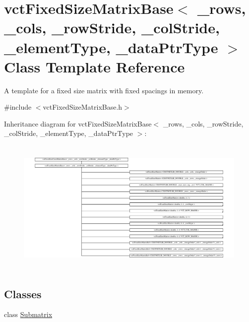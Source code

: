 \hypertarget{classvct_fixed_size_matrix_base}{\section{vct\-Fixed\-Size\-Matrix\-Base$<$ \-\_\-rows, \-\_\-cols, \-\_\-row\-Stride, \-\_\-col\-Stride, \-\_\-element\-Type, \-\_\-data\-Ptr\-Type $>$ Class Template Reference}
\label{classvct_fixed_size_matrix_base}
}


A template for a fixed size matrix with fixed spacings in memory.  




{\ttfamily \#include $<$vct\-Fixed\-Size\-Matrix\-Base.\-h$>$}

Inheritance diagram for vct\-Fixed\-Size\-Matrix\-Base$<$ \-\_\-rows, \-\_\-cols, \-\_\-row\-Stride, \-\_\-col\-Stride, \-\_\-element\-Type, \-\_\-data\-Ptr\-Type $>$\-:\begin{figure}[H]
\begin{center}
\leavevmode
\includegraphics[height=6.627218cm]{d5/dad/classvct_fixed_size_matrix_base}
\end{center}
\end{figure}
\subsection*{Classes}
\begin{DoxyCompactItemize}
\item 
class \hyperlink{classvct_fixed_size_matrix_base_1_1_submatrix}{Submatrix}
\end{DoxyCompactItemize}
